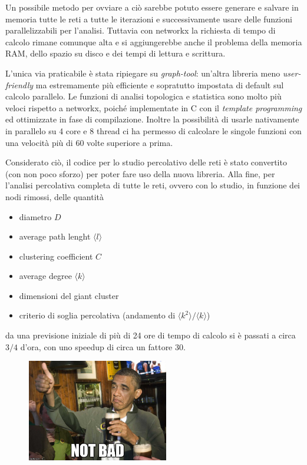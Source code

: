 Un possibile metodo per ovviare a ciò sarebbe potuto essere generare e salvare in memoria tutte le reti a tutte le iterazioni e successivamente usare delle funzioni parallelizzabili per l'analisi. Tuttavia con networkx la richiesta di tempo di calcolo rimane comunque alta e si aggiungerebbe anche il problema della memoria RAM, dello spazio su disco e dei tempi di lettura e scrittura.

L'unica via praticabile è stata ripiegare su \emph{graph-tool}: un'altra libreria meno \emph{user-friendly} ma estremamente più efficiente e sopratutto impostata di default sul calcolo parallelo. Le funzioni di analisi topologica e statistica sono molto più veloci rispetto a networkx, poiché implementate in C con il \emph{template programming} ed ottimizzate in fase di compilazione. Inoltre la possibilità di usarle nativamente in parallelo su 4 core e 8 thread ci ha permesso di calcolare le singole funzioni con una velocità più di 60 volte superiore a prima.

Considerato ciò, il codice per lo studio percolativo delle reti è stato convertito (con non poco sforzo) per poter fare uso della nuova libreria. Alla fine, per l'analisi percolativa completa di tutte le reti, ovvero con lo studio, in funzione dei nodi rimossi, delle quantità 

\begin{itemize}
 \item   diametro $D$
 \item   average path lenght $\langle l \rangle$
 \item   clustering coefficient $C$
 \item   average degree $\langle k \rangle$
 \item   dimensioni del giant cluster
 \item   criterio di soglia percolativa (andamento di $\langle k^2 \rangle / \langle k \rangle$)
\end{itemize}

da una previsione iniziale di più di 24 ore di tempo di calcolo si è passati a circa $3/4$ d'ora, con uno speedup di circa un fattore 30.

\begin{figure}[h!]
	\centering
	\includegraphics[width=0.55\textwidth]{./Immagini/Attack/meme_Obama.jpg}
\end{figure}


